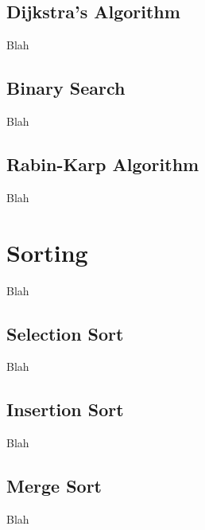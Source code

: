 \subsection{Dijkstra's Algorithm}

Blah


\subsection{Binary Search}

Blah


\subsection{Rabin-Karp Algorithm}

Blah \\


\toclineskip
\section{Sorting}

Blah


\subsection{Selection Sort}

Blah


\subsection{Insertion Sort}

Blah


\subsection{Merge Sort}

Blah

